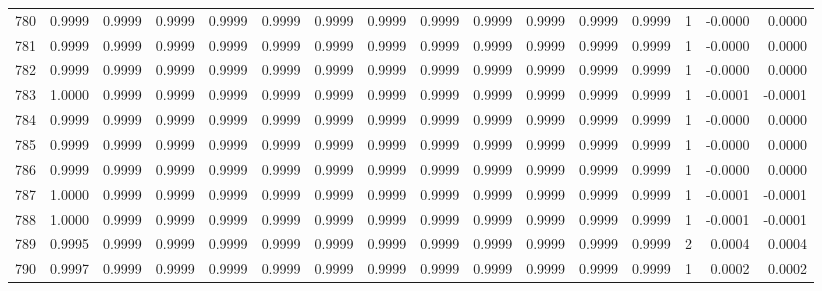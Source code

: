 \begin{tabular}{lrrrrrrrrrrrrrrr}
780 &      0.9999 &  0.9999 &  0.9999 &  0.9999 &  0.9999 &  0.9999 &  0.9999 &  0.9999 &  0.9999 &  0.9999 &   0.9999 &     0.9999 &      1 &                   -0.0000 &                     0.0000 \\
781 &      0.9999 &  0.9999 &  0.9999 &  0.9999 &  0.9999 &  0.9999 &  0.9999 &  0.9999 &  0.9999 &  0.9999 &   0.9999 &     0.9999 &      1 &                   -0.0000 &                     0.0000 \\
782 &      0.9999 &  0.9999 &  0.9999 &  0.9999 &  0.9999 &  0.9999 &  0.9999 &  0.9999 &  0.9999 &  0.9999 &   0.9999 &     0.9999 &      1 &                   -0.0000 &                     0.0000 \\
783 &      1.0000 &  0.9999 &  0.9999 &  0.9999 &  0.9999 &  0.9999 &  0.9999 &  0.9999 &  0.9999 &  0.9999 &   0.9999 &     0.9999 &      1 &                   -0.0001 &                    -0.0001 \\
784 &      0.9999 &  0.9999 &  0.9999 &  0.9999 &  0.9999 &  0.9999 &  0.9999 &  0.9999 &  0.9999 &  0.9999 &   0.9999 &     0.9999 &      1 &                   -0.0000 &                     0.0000 \\
785 &      0.9999 &  0.9999 &  0.9999 &  0.9999 &  0.9999 &  0.9999 &  0.9999 &  0.9999 &  0.9999 &  0.9999 &   0.9999 &     0.9999 &      1 &                   -0.0000 &                     0.0000 \\
786 &      0.9999 &  0.9999 &  0.9999 &  0.9999 &  0.9999 &  0.9999 &  0.9999 &  0.9999 &  0.9999 &  0.9999 &   0.9999 &     0.9999 &      1 &                   -0.0000 &                     0.0000 \\
787 &      1.0000 &  0.9999 &  0.9999 &  0.9999 &  0.9999 &  0.9999 &  0.9999 &  0.9999 &  0.9999 &  0.9999 &   0.9999 &     0.9999 &      1 &                   -0.0001 &                    -0.0001 \\
788 &      1.0000 &  0.9999 &  0.9999 &  0.9999 &  0.9999 &  0.9999 &  0.9999 &  0.9999 &  0.9999 &  0.9999 &   0.9999 &     0.9999 &      1 &                   -0.0001 &                    -0.0001 \\
789 &      0.9995 &  0.9999 &  0.9999 &  0.9999 &  0.9999 &  0.9999 &  0.9999 &  0.9999 &  0.9999 &  0.9999 &   0.9999 &     0.9999 &      2 &                    0.0004 &                     0.0004 \\
790 &      0.9997 &  0.9999 &  0.9999 &  0.9999 &  0.9999 &  0.9999 &  0.9999 &  0.9999 &  0.9999 &  0.9999 &   0.9999 &     0.9999 &      1 &                    0.0002 &                     0.0002 \\

\end{tabular}
